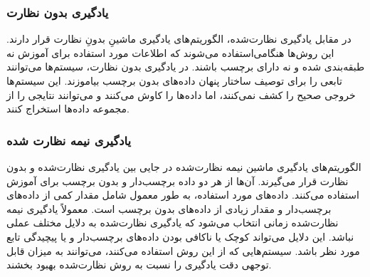 \subsubsection{یادگیری بدون نظارت}

در مقابل  یادگیری نظارت‌شده، الگوریتم‌های یادگیری ماشینِ بدونِ نظارت قرار دارند. این روش‌ها هنگامی‌استفاده می‌شوند که اطلاعات مورد استفاده برای آموزش نه طبقه‌بندی شده و نه دارای برچسب باشند. در یادگیری بدون نظارت، سیستم‌ها می‌توانند تابعی را برای توصیف ساختار پنهان داده‌های بدون برچسب بیاموزند. این سیستم‌ها خروجی صحیح را کشف نمی‌کنند، اما داده‌ها را کاوش می‌کنند و می‌توانند نتایجی را از مجموعه داده‌ها استخراج کنند.


\subsubsection{یادگیری نیمه نظارت شده}

الگوریتم‌های یادگیری ماشین نیمه نظارت‌شده در جایی بین یادگیری نظارت‌شده و بدون نظارت قرار می‌گیرند. آن‌ها از هر دو داده برچسب‌دار و بدون برچسب برای آموزش استفاده می‌کنند. داده‌های مورد استفاده، به طور معمول شامل مقدار کمی از داده‌های برچسب‌دار و مقدار زیادی از داده‌های بدون برچسب است. معمولاً یادگیری نیمه نظارت‌شده زمانی انتخاب می‌شود که یادگیری نظارت‌شده به دلایل مختلف عملی نباشد. این دلایل می‌تواند کوچک یا ناکافی بودن داده‌های برچسب‌دار و یا پیچیدگی تابع مورد نظر باشد. سیستم‌هایی که از این روش استفاده می‌کنند، می‌توانند به میزان قابل توجهی دقت یادگیری را نسبت به روش نظارت‌شده بهبود بخشند. 

